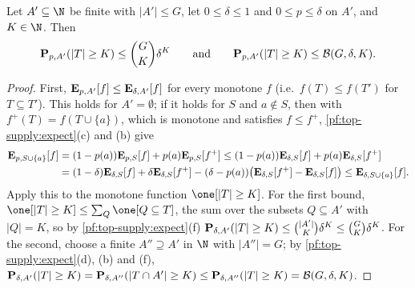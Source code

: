 \begin{lemma}[Tails]\label{pf:top-supply:tails}
Let $A'\subseteq\N$ be finite with $|A'|\le G$, let $0\le\delta\le1$ and $0\le p\le\delta$ on $A'$, and $K\in\N$. Then
\[
\mathbf{P}_{p,A'}(|T|\ge K)\le\binom GK\delta^K\qquad\text{and}\qquad\mathbf{P}_{p,A'}(|T|\ge K)\le\mathcal{B}(G,\delta,K).
\]
 
\end{lemma}

\begin{proof}
First, $\mathbf{E}_{p,A'}[f]\le\mathbf{E}_{\delta,A'}[f]$ for every monotone $f$ (i.e.\ $f(T)\le f(T')$ for
$T\subseteq T'$). This holds for $A'=\emptyset$; if it holds for $S$ and $a\notin S$, then with $f^+(T)=f(T\cup\{a\})$,
which is monotone and satisfies $f\le f^+$, \cref{pf:top-supply:expect}(c) and (b) give
\begin{align*}
\mathbf{E}_{p,S\cup\{a\}}[f]&=(1-p(a))\mathbf{E}_{p,S}[f]+p(a)\mathbf{E}_{p,S}[f^+]
\le(1-p(a))\mathbf{E}_{\delta,S}[f]+p(a)\mathbf{E}_{\delta,S}[f^+]\\
&=(1-\delta)\mathbf{E}_{\delta,S}[f]+\delta\mathbf{E}_{\delta,S}[f^+]-(\delta-p(a))\big(\mathbf{E}_{\delta,S}[f^+]-\mathbf{E}_{\delta,S}[f]\big)
\le\mathbf{E}_{\delta,S\cup\{a\}}[f].
\end{align*}
Apply this to the monotone function $\one[|T|\ge K]$. For the first bound, $\one[|T|\ge K]\le\sum_{Q}\one[Q\subseteq T]$,
the sum over the subsets $Q\subseteq A'$ with $|Q|=K$, so by \cref{pf:top-supply:expect}(f)
$\mathbf{P}_{\delta,A'}(|T|\ge K)\le\binom{|A'|}K\delta^K\le\binom GK\delta^K$. For the second, choose a finite
$A''\supseteq A'$ in $\N$ with $|A''|=G$; by \cref{pf:top-supply:expect}(d), (b) and (f),
$\mathbf{P}_{\delta,A'}(|T|\ge K)=\mathbf{P}_{\delta,A''}(|T\cap A'|\ge K)\le\mathbf{P}_{\delta,A''}(|T|\ge K)
=\mathcal{B}(G,\delta,K)$.
\end{proof}

